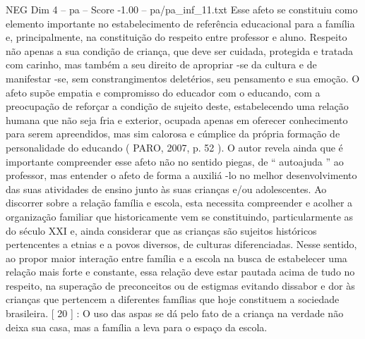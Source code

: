 \begin{textsample}{NEG Dim 4 – pa – Score -1.00 – pa/pa\_inf\_11.txt}
Esse afeto se constituiu como elemento importante no estabelecimento de referência educacional para a família e, principalmente, na constituição do respeito entre professor e aluno.
Respeito não apenas a sua condição de criança, que deve ser cuidada, protegida e tratada com carinho, mas também a seu direito de apropriar -se da cultura e de manifestar -se, sem constrangimentos deletérios, seu pensamento e sua emoção.
O afeto supõe empatia e compromisso do educador com o educando, com a preocupação de reforçar a condição de sujeito deste, estabelecendo uma relação humana que não seja fria e exterior, ocupada apenas em oferecer conhecimento para serem apreendidos, mas sim calorosa e cúmplice da própria formação de personalidade do educando ( PARO, 2007, p. 52 ).
O autor revela ainda que é importante compreender esse afeto não no sentido piegas, de “ autoajuda ” ao professor, mas entender o afeto de forma a auxiliá -lo no melhor desenvolvimento das suas atividades de ensino junto às suas crianças e/ou adolescentes.
Ao discorrer sobre a relação família e escola, esta necessita compreender e acolher a organização familiar que historicamente vem se constituindo, particularmente as do século XXI e, ainda considerar que as crianças são sujeitos históricos pertencentes a etnias e a povos diversos, de culturas diferenciadas.
Nesse sentido, ao propor maior interação entre família e a escola na busca de estabelecer uma relação mais forte e constante, essa relação deve estar pautada acima de tudo no respeito, na superação de preconceitos ou de estigmas evitando dissabor e dor às crianças que pertencem a diferentes famílias que hoje constituem a sociedade brasileira. [ 20 ] : O uso das aspas se dá pelo fato de a criança na verdade não deixa sua casa, mas a família a leva para o espaço da escola.

\end{textsample}
